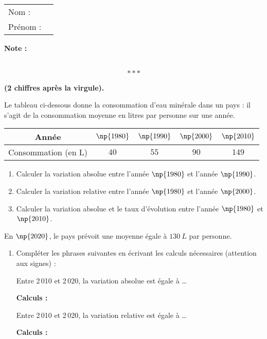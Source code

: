 \documentclass[10pt,french]{article}
\newcommand\competences{
\setcounter{exo}{0}
\begin{tabular}{ll} Nom : \\[5pt] Prénom : \end{tabular}
\hfill
\textbf{Note :}\renewcommand\arraystretch{2.3}
\begin{tabularx}{0.17\linewidth}{|X|}
\hline
\slashbox{\Huge\bfseries\phantom{10}}{\Huge\bfseries 10}\\
\hline
\end{tabularx}\renewcommand\arraystretch{1}
\[***\]
}
\begin{document}
\competences

\textbf{ (2 chiffres après la virgule).}\bigskip

Le tableau ci-dessous donne la consommation d'eau minérale dans un pays : il s'agit de la consommation moyenne en litres par personne sur une année.

\begin{center}
\renewcommand\arraystretch{1.5}
    \begin{tabular}{*{5}{|c}|}
    \hline
        Année & $\np{1980}$ & $\np{1990}$ & $\np{2000}$ & $\np{2010}$ \\
    \hline
        Consommation (en L) & $40$ & $55$ & $90$ & $149$ \\
    \hline
    \end{tabular}
\renewcommand\arraystretch{1}
\end{center}\medskip

\begin{enumerate}
    \item Calculer la variation absolue entre l'année $\np{1980}$ et l'année $\np{1990}$.\vspace{2cm}
    \item Calculer la variation relative entre l'année $\np{1980}$ et l'année $\np{2000}$.\vspace{2cm}
    \item Calculer la variation absolue et le taux d'évolution entre l'année $\np{1980}$ et $\np{2010}$.\vspace{2cm}
\end{enumerate}

En $\np{2020}$, le pays prévoit une moyenne égale à $130~L$ par personne.

\begin{enumerate}[resume]
    \item Compléter les phrases suivantes en écrivant les calculs nécessaires (attention aux signes) :\par
    {\cursive Entre 2\,010 et 2\,020, la variation absolue est égale à \ldots} \par\medskip
    \textbf{Calculs :}\vspace{2cm}
        
    {\cursive Entre 2\,010 et 2\,020, la variation relative est égale à \ldots \par\medskip}
    \textbf{Calculs :}\vspace{2cm}
\end{enumerate}
\end{document}
